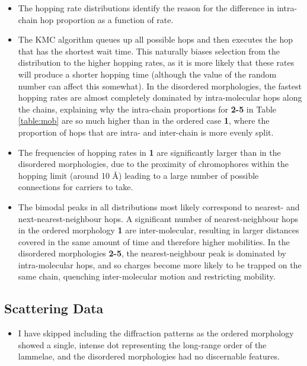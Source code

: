 \documentclass[12pt]{article}
\begin{document}
\clearpage

\begin{itemize}
    \item{The hopping rate distributions identify the reason for the difference in intra-chain hop proportion as a function of rate.}
    \item{The KMC algorithm queues up all possible hops and then executes the hop that has the shortest wait time.
        This naturally biases selection from the distribution to the higher hopping rates, as it is more likely that these rates will produce a shorter hopping time (although the value of the random number can affect this somewhat).
    In the disordered morphologies, the fastest hopping rates are almost completely dominated by intra-molecular hops along the chains, explaining why the intra-chain proportions for \textbf{2-5} in Table \ref{table:mob} are so much higher than in the ordered case \textbf{1}, where the proportion of hops that are intra- and inter-chain is more evenly split.}
    \item{The frequencies of hopping rates in \textbf{1} are significantly larger than in the disordered morphologies, due to the proximity of chromophores within the hopping limit (around 10 \AA) leading to a large number of possible connections for carriers to take.}
    \item{The bimodal peaks in all distributions most likely correspond to nearest- and next-nearest-neighbour hops. 
        A significant number of nearest-neighbour hops in the ordered morphology \textbf{1} are inter-molecular, resulting in larger distances covered in the same amount of time and therefore higher mobilities.
    In the disordered morphologies \textbf{2-5}, the nearest-neighbour peak is dominated by intra-molecular hops, and so charges become more likely to be trapped on the same chain, quenching inter-molecular motion and restricting mobility.}
\end{itemize}


\subsection{Scattering Data}
 
\begin{itemize}
    \item{I have skipped including the diffraction patterns as the ordered morphology showed a single, intense dot representing the long-range order of the lammelae, and the disordered morphologies had no discernable features.}
\end{itemize}
\end{document}
